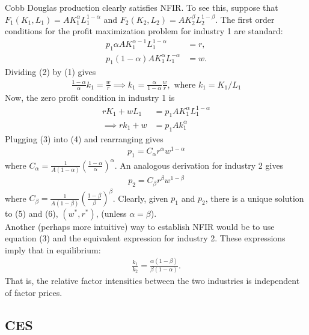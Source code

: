 \documentclass[12pt]{article}
\begin{document}
Cobb Douglas production clearly satisfies NFIR. To see this, suppose that $F_1(K_1,L_1) = AK_1^\alpha L_1^{1-\alpha}$ and $F_2(K_2,L_2) = AK_2^\beta L_2^{1-\beta}$. The first order conditions for the profit maximization problem for industry 1 are standard:
\begin{align}
p_1\alpha AK_1^{\alpha-1}L_1^{1-\alpha} &= r,\\
p_1(1-\alpha) AK_1^{\alpha}L_1^{-\alpha} &= w.
\end{align}
Dividing (2) by (1) gives
\begin{align}
\frac{1-\alpha}{\alpha} k_1 = \frac{w}{r} \implies k_1 = \frac{\alpha}{1-\alpha}\frac{w}{r}, \text{ where } k_1 = K_1/L_1
\end{align}
Now, the zero profit condition in industry 1 is
\begin{align}
rK_1 + w L_1 &= p_1  AK_1^\alpha L_1^{1-\alpha} \nonumber\\
\implies r k_1 + w &= p_1 A k_1^\alpha
\end{align}
Plugging (3) into (4) and rearranging gives
\begin{align}
p_1 = C_\alpha r^\alpha w^{1-\alpha}
\end{align}
where $C_\alpha = \frac{1}{A(1-\alpha)}\left(\frac{1-\alpha}{\alpha}\right)^\alpha$. An analogous derivation for industry 2 gives
\begin{align}
p_2 = C_\beta r^\beta w^{1-\beta}
\end{align}
where $C_\beta = \frac{1}{A(1-\beta)}\left(\frac{1-\beta}{\beta}\right)^\beta$.
Clearly, given $p_1$ and $p_2$, there is a unique solution to (5) and (6), $(w^*,r^*)$, (unless $\alpha = \beta$).\\

Another (perhaps more intuitive) way to establish NFIR would be to use equation (3) and the equivalent expression for industry 2. These expressions imply that in equilibrium:
\begin{align*}
\frac{k_1}{k_2} = \frac{\alpha (1-\beta)}{\beta(1-\alpha)}.
\end{align*}
That is, the relative factor intensities between the two industries is independent of factor prices.\\


\subsection{CES}
\end{document}
